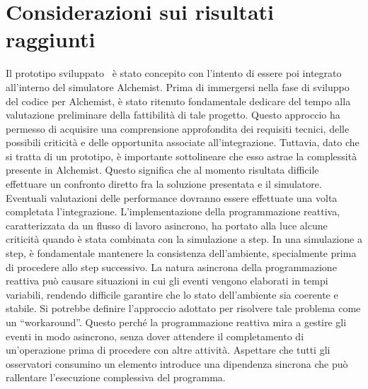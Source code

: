 \documentclass[12pt,a4paper,openright,twoside]{book}
\begin{document}
\section{Considerazioni sui risultati raggiunti}
Il prototipo sviluppato~\cite{https://doi.org/10.5281/zenodo.10718499} è stato concepito con l'intento di essere poi integrato all'interno del simulatore Alchemist. Prima di immergersi nella fase di sviluppo del codice per Alchemist, è stato ritenuto fondamentale dedicare del tempo alla valutazione preliminare della fattibilità di tale progetto. Questo approccio ha permesso di acquisire una comprensione approfondita dei requisiti tecnici, delle possibili criticità e delle opportunita associate all'integrazione. 
Tuttavia, dato che si tratta di un prototipo, è importante sottolineare che esso astrae la complessità presente in Alchemist. Questo significa che al momento risultata difficile effettuare un confronto diretto fra la soluzione presentata e il simulatore. Eventuali valutazioni delle performance dovranno essere effettuate una volta completata l'integrazione. 
L'implementazione della programmazione reattiva, caratterizzata da un flusso di lavoro asincrono, ha portato alla luce alcune criticità quando è stata combinata con la simulazione a step. In una simulazione a step, è fondamentale mantenere la consistenza dell'ambiente, specialmente prima di procedere allo step successivo. La natura asincrona della programmazione reattiva può causare situazioni in cui gli eventi vengono elaborati in tempi variabili, rendendo difficile garantire che lo stato dell'ambiente sia coerente e stabile. Si potrebbe definire l'approccio adottato per risolvere tale problema come un ``workaround''. Questo perché la programmazione reattiva mira a gestire gli eventi in modo asincrono, senza dover attendere il completamento di un'operazione prima di procedere con altre attività. Aspettare che tutti gli osservatori consumino un elemento introduce una dipendenza sincrona che può rallentare l'esecuzione complessiva del programma.
\end{document}
